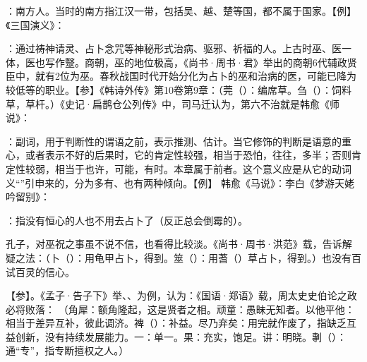 {
\begin{lyitemize}
\item {}：南方人。当时的南方指江汉一带，包括吴、越、楚等国，都不属于国家。【例】《三国演义》：
\item {}：通过祷神请灵、占卜念咒等神秘形式治病、驱邪、祈福的人。上古时巫、医一体，医也写作毉。商朝，巫的地位极高，《尚书·周书·君》举出的商朝6代辅政贤臣中，就有2位为巫。春秋战国时代开始分化为占卜的巫和治病的医，可能已降为较低等的职业。【参】《韩诗外传》第10卷第9章：（莞（）：编席草。刍（）：饲料草，草杆。）《史记·扁鹊仓公列传》中，司马迁认为，第六不治就是韩愈《师说》：

\item {}：副词，用于判断性的谓语之前，表示推测、估计。当它修饰的判断是语意的重心，或者表示不好的后果时，它的肯定性较强，相当于恐怕，往往，多半；否则肯定性较弱，相当于也许，可能，有时。本章属于前者。这个意义应是从它的动词义“”引申来的，分为多有、也有两种倾向。【例】   韩愈《马说》：李白《梦游天姥吟留别》： %

\item {}：指没有恒心的人也不用去占卜了（反正总会倒霉的）。%
\end{lyitemize}
孔子，对巫祝之事虽不说不信，也看得比较淡。《尚书·周书·洪范》载，告诉解疑之法：（卜（）：用龟甲占卜，得到。筮（）：用蓍（）草占卜，得到。）也没有百试百灵的信心。
}
{}


{
【参】。《孟子·告子下》举、、为例，认为：《国语·郑语》载，周太史史伯论之政必将败落：
（角犀：额角隆起，这是贤者之相。顽童：愚昧无知者。以他平他：相当于差异互补，彼此调济。裨（）：补益。尽乃弃矣：用完就作废了，指缺乏互益创新，没有持续发展能力。一：单一。果：充实，饱足。讲：明晓。剸（）：通“专”，指专断擅权之人。）
}
{}


